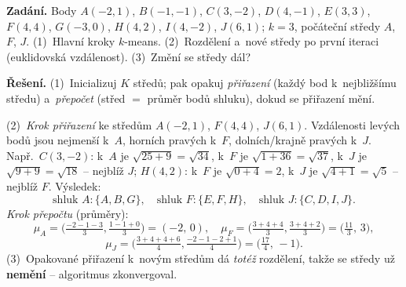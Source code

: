 \begin{priklad}
\par
\textbf{Zadání.} Body $A(-2,1)$, $B(-1,-1)$, $C(3,-2)$, $D(4,-1)$, $E(3,3)$, $F(4,4)$, $G(-3,0)$, $H(4,2)$, $I(4,-2)$, $J(6,1)$; $k=3$, počáteční středy $A$, $F$, $J$. (1)~Hlavní kroky $k$-means. (2)~Rozdělení a~nové středy po první iteraci (euklidovská vzdálenost). (3)~Změní se středy dál?

\smallskip
\textbf{Řešení.} (1)~Inicializuj $K$ středů; pak opakuj \emph{přiřazení} (každý bod k~nejbližšímu středu) a~\emph{přepočet} (střed $=$ průměr bodů shluku), dokud se přiřazení mění.

(2)~\emph{Krok přiřazení} ke středům $A(-2,1)$, $F(4,4)$, $J(6,1)$. Vzdálenosti levých bodů jsou nejmenší k~$A$, horních pravých k~$F$, dolních/krajně pravých k~$J$. Např.\ $C(3,-2)$: k~$A$ je $\sqrt{25+9}=\sqrt{34}$, k~$F$ je $\sqrt{1+36}=\sqrt{37}$, k~$J$ je $\sqrt{9+9}=\sqrt{18}$ -- nejblíž $J$; $H(4,2)$: k~$F$ je $\sqrt{0+4}=2$, k~$J$ je $\sqrt{4+1}=\sqrt5$ -- nejblíž $F$. Výsledek:
\[
  \text{shluk }A:\{A,B,G\},\quad \text{shluk }F:\{E,F,H\},\quad \text{shluk }J:\{C,D,I,J\}.
\]
\emph{Krok přepočtu} (průměry):
\[
  \mu_A=\Big(\tfrac{-2-1-3}{3},\tfrac{1-1+0}{3}\Big)=\boxed{(-2,\,0)},\quad
  \mu_F=\Big(\tfrac{3+4+4}{3},\tfrac{3+4+2}{3}\Big)=\boxed{\big(\tfrac{11}{3},\,3\big)},
\]
\[
  \mu_J=\Big(\tfrac{3+4+4+6}{4},\tfrac{-2-1-2+1}{4}\Big)=\boxed{\big(\tfrac{17}{4},\,-1\big)}.
\]
(3)~Opakované přiřazení k~novým středům dá \emph{totéž} rozdělení, takže se středy už \textbf{nemění} -- algoritmus zkonvergoval.
\end{priklad}

